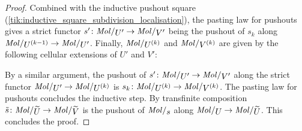\begin{proof}
    Combined with the inductive pushout square (\ref{tik:inductive_square_subdivision_localisation}), the pasting law for pushouts gives a strict functor \( s' \colon \molecin{U'} \to \molecin{V'} \) being the pushout of \( s_k \) along \( \molecin{\order{k - 1}{U}} \to \molecin{U'} \).
    Finally, \( \molecin{\order k U} \) and \(  {\molecin{\order k V}} \) are given by the following cellular extensions of \( U' \) and \( V' \):
    \begin{center}
    \end{center}
    By a similar argument, the pushout of \( s' \colon  \molecin{U'} \to \molecin{V'} \) along the strict functor \( \molecin{U'} \to \molecin{\order{k}{U}} \) is \( s_k \colon \molecin{\order{k}{U}} \to \molecin{\order{k}{V}} \).
    The pasting law for pushouts concludes the inductive step.
    By transfinite composition \( \tilde{s} \colon \molecin{\selfloc{U}} \to \molecin{\selfloc{V}} \) is the pushout of \( \molecin{s} \) along \( \molecin{U} \to \molecin{\selfloc U} \).
    This concludes the proof.
\end{proof}

